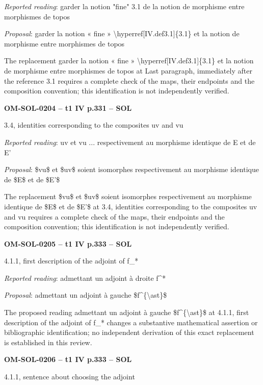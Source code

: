 \emph{Reported reading}: garder la notion "fine" 3.1 de la notion de morphisme entre morphismes de topos\par
\emph{Proposal}: garder la notion « fine » \textbackslash{}hyperref[IV.def3.1]\{3.1\} et la notion de morphisme entre morphismes de topos\par
The replacement garder la notion « fine » \textbackslash{}hyperref[IV.def3.1]\{3.1\} et la notion de morphisme entre morphismes de topos at Last paragraph, immediately after the reference 3.1 requires a complete check of the maps, their endpoints and the composition convention; this identification is not independently verified.\par
\par\noindent\textbf{OM-SOL-0204 -- t1 IV p.331 -- SOL}\par
3.4, identities corresponding to the composites uv and vu\par
\emph{Reported reading}: uv et vu ... respectivement au morphisme identique de E et de E'\par
\emph{Proposal}: \$vu\$ et \$uv\$ soient isomorphes respectivement au morphisme identique de \$E\$ et de \$E'\$\par
The replacement \$vu\$ et \$uv\$ soient isomorphes respectivement au morphisme identique de \$E\$ et de \$E'\$ at 3.4, identities corresponding to the composites uv and vu requires a complete check of the maps, their endpoints and the composition convention; this identification is not independently verified.\par
\par\noindent\textbf{OM-SOL-0205 -- t1 IV p.333 -- SOL}\par
4.1.1, first description of the adjoint of f\_*\par
\emph{Reported reading}: admettant un adjoint à droite f\textasciicircum{}*\par
\emph{Proposal}: admettant un adjoint à gauche \$f\textasciicircum{}\{\textbackslash{}ast\}\$\par
The proposed reading admettant un adjoint à gauche \$f\textasciicircum{}\{\textbackslash{}ast\}\$ at 4.1.1, first description of the adjoint of f\_* changes a substantive mathematical assertion or bibliographic identification; no independent derivation of this exact replacement is established in this review.\par
\par\noindent\textbf{OM-SOL-0206 -- t1 IV p.333 -- SOL}\par
4.1.1, sentence about choosing the adjoint\par
